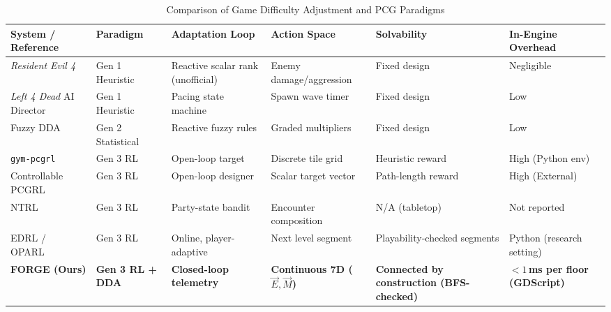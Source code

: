 \begin{table}[!htbp]
\centering
\caption{Comparison of Game Difficulty Adjustment and PCG Paradigms}
\label{tab:lit_comparison}
\scriptsize
\begin{tabular}{p{}p{}p{}p{}p{}p{}}
\toprule
\textbf{System / Reference} & \textbf{Paradigm} & \textbf{Adaptation Loop} & \textbf{Action Space} & \textbf{Solvability} & \textbf{In-Engine Overhead} \\
\midrule
\textit{Resident Evil 4}~\cite{engadget2015re4} & Gen 1 Heuristic & Reactive scalar rank (unofficial) & Enemy damage/aggression & Fixed design & Negligible \\
\textit{Left 4 Dead} AI Director~\cite{booth2009l4d} & Gen 1 Heuristic & Pacing state machine & Spawn wave timer & Fixed design & Low \\
Fuzzy DDA~\cite{chrysafiadi2023fuzzy} & Gen 2 Statistical & Reactive fuzzy rules & Graded multipliers & Fixed design & Low \\
\texttt{gym-pcgrl}~\cite{khalifa2020pcgrl} & Gen 3 RL & Open-loop target & Discrete tile grid & Heuristic reward & High (Python env) \\
Controllable PCGRL~\cite{earle2021controllable} & Gen 3 RL & Open-loop designer & Scalar target vector & Path-length reward & High (External) \\
NTRL~\cite{romeo2025ntrl} & Gen 3 RL & Party-state bandit & Encounter composition & N/A (tabletop) & Not reported \\
EDRL / OPARL~\cite{shu2021edrl, wang2022oparl} & Gen 3 RL & Online, player-adaptive & Next level segment & Playability-checked segments & Python (research setting) \\
\textbf{FORGE (Ours)} & \textbf{Gen 3 RL + DDA} & \textbf{Closed-loop telemetry} & \textbf{Continuous 7D ($\vec{E}, \vec{M}$)} & \textbf{Connected by construction (BFS-checked)} & \textbf{$<1$\,ms per floor (GDScript)} \\
\bottomrule
\end{tabular}
\end{table}

